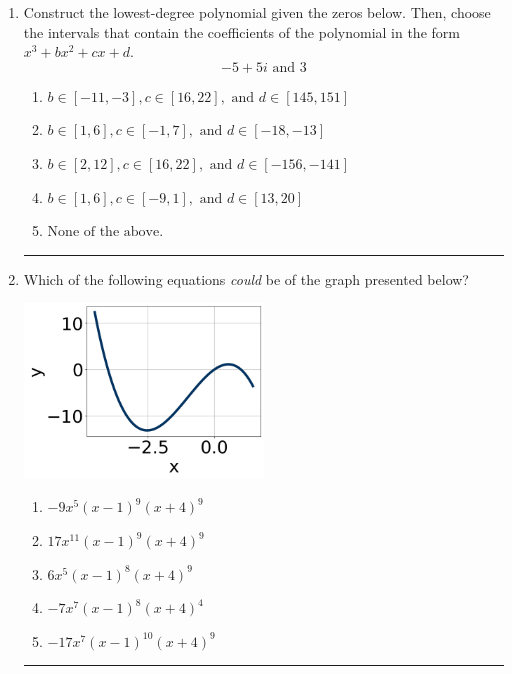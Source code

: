 \documentclass[14pt]{extbook}
\newcommand{\litem}[1]{\item#1\hspace*{-1cm}\rule{\textwidth}{0.4pt}}
\begin{document}
\begin{enumerate}
\litem{
Construct the lowest-degree polynomial given the zeros below. Then, choose the intervals that contain the coefficients of the polynomial in the form $x^3+bx^2+cx+d$.\[ -5 + 5 i \text{ and } 3 \]\begin{enumerate}[label=\Alph*.]
\item \( b \in [-11, -3], c \in [16, 22], \text{ and } d \in [145, 151] \)
\item \( b \in [1, 6], c \in [-1, 7], \text{ and } d \in [-18, -13] \)
\item \( b \in [2, 12], c \in [16, 22], \text{ and } d \in [-156, -141] \)
\item \( b \in [1, 6], c \in [-9, 1], \text{ and } d \in [13, 20] \)
\item \( \text{None of the above.} \)

\end{enumerate} }
\litem{
Which of the following equations \textit{could} be of the graph presented below?
\begin{center}
    \includegraphics[width=0.5\textwidth]{../Figures/polyGraphToFunctionB.png}
\end{center}
\begin{enumerate}[label=\Alph*.]
\item \( -9x^{5} (x - 1)^{9} (x + 4)^{9} \)
\item \( 17x^{11} (x - 1)^{9} (x + 4)^{9} \)
\item \( 6x^{5} (x - 1)^{8} (x + 4)^{9} \)
\item \( -7x^{7} (x - 1)^{8} (x + 4)^{4} \)
\item \( -17x^{7} (x - 1)^{10} (x + 4)^{9} \)


\end{enumerate}}
\end{enumerate}
\end{document}
